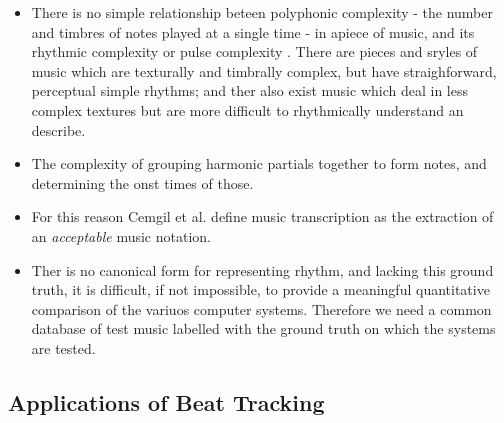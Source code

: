 \documentclass{scrartcl}
\begin{document}
\begin{itemize}
\item There is no simple relationship beteen polyphonic complexity - the number and timbres of notes played at a single time - in apiece of music, and its rhythmic complexity or pulse complexity \cite{Scheirer1998}. There are pieces and sryles of music which are texturally and timbrally complex, but have straighforward, perceptual simple rhythms; and ther also exist music which deal in less complex textures but are more difficult to rhythmically understand an describe.
\item The complexity of grouping harmonic partials together to form notes, and determining the onst times of those.
\item For this reason Cemgil et al. \cite{Cemgil2001} define music transcription as the extraction of an \emph{acceptable} music notation.
\item Ther is no canonical form for representing rhythm, and lacking this ground truth, it is difficult, if not impossible, to provide a meaningful quantitative comparison of the variuos computer systems. Therefore we need a common database of test music labelled with the ground truth on which the systems are tested. 
\end{itemize}





\subsection{Applications of Beat Tracking}
\end{document}
